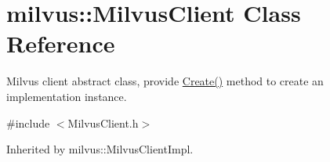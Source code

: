 \hypertarget{classmilvus_1_1_milvus_client}{}\section{milvus\+:\+:Milvus\+Client Class Reference}
\label{classmilvus_1_1_milvus_client}


Milvus client abstract class, provide \hyperlink{classmilvus_1_1_milvus_client_a2fadefe95c16f9a5ea11bc899fc878bd}{Create()} method to create an implementation instance.  




{\ttfamily \#include $<$Milvus\+Client.\+h$>$}



Inherited by milvus\+::\+Milvus\+Client\+Impl.

